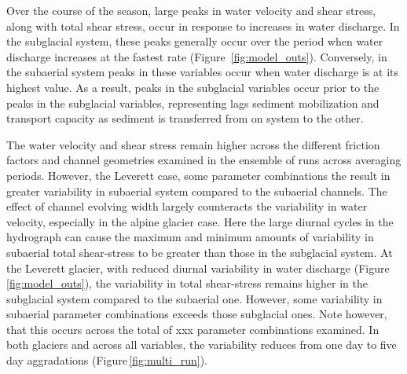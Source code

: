 \documentclass[draft]{agujournal2019}
\begin{document}
Over the course of the season, large peaks in water velocity and shear stress, along with total shear stress, occur in response to increases in water discharge.
In the subglacial system, these peaks generally occur over the period when water discharge increases at the fastest rate (Figure~\ref{fig:model_outs}).
Conversely, in the subaerial system peaks in these variables occur when water discharge is at its highest value.
As a result, peaks in the subglacial variables occur prior to the peaks in the subglacial variables, representing lags sediment mobilization and  transport capacity as sediment is transferred from on system to the other.

The water velocity and shear stress remain higher across the different friction factors and channel geometries examined in the ensemble of runs across averaging periods.
However, the Leverett case, some parameter combinations the result in greater variability in subaerial system compared to the subaerial channels.
The effect of channel evolving width largely counteracts the variability in water velocity, especially in the alpine glacier case.
Here the large diurnal cycles in the hydrograph can cause the maximum and minimum amounts of variability in subaerial total shear-stress to be greater than those in the subglacial system.
At the Leverett glacier, with reduced diurnal variability in water discharge (Figure\,\ref{fig:model_outs}), the variability in total shear-stress remains higher in the subglacial system compared to the subaerial one.
However, some variability in subaerial parameter combinations exceeds those subglacial ones.
Note however, that this occurs across the total of xxx parameter combinations examined.
In both glaciers and across all variables, the variability reduces from one day to five day aggradations (Figure\,\ref{fig:multi_run}).
\end{document}
